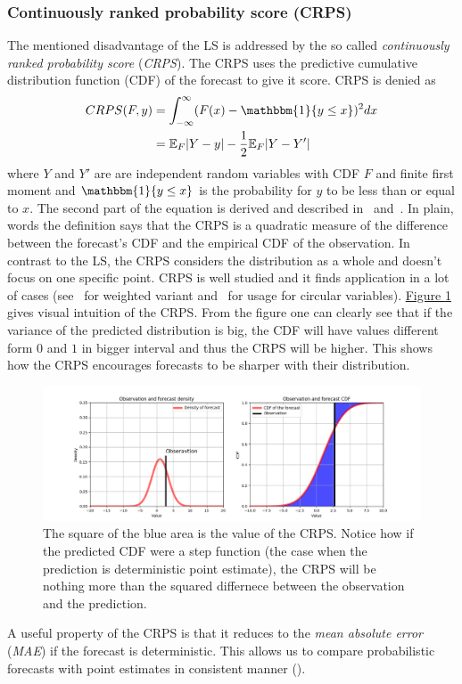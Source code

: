 \documentclass[12pt,a4paper,twoside]{scrartcl}
\numberwithin{equation}{section}
\newcommand{\reffig}[1]{\hyperref[#1]{Figure \ref*{#1}}}
\begin{document}
\subsubsection{Continuously ranked probability score (CRPS)}\label{sec:crps}
The mentioned disadvantage of the LS is addressed by the so called \emph{continuously ranked probability score} (\emph{CRPS}). The CRPS uses the predictive cumulative distribution function (CDF) of the forecast to give it score. CRPS is denied as
\begin{align}
  \label{eq:crps}
  CRPS(F,y)  &= \int_{-\infty}^{\infty}(F(x) - \mathbbm{1}\{y \leq x \})^2dx \\
             &= \mathbb{E}_F|Y - y| - \frac{1}{2}\mathbb{E}_F|Y - Y'|
\end{align}
where \(Y\) and \(Y'\) are are independent random variables with CDF \(F\) and finite first moment and \(\mathbbm{1}\{y \leq x \}\) is the probability for \(y\) to be less than or equal to \(x \). The second part of the equation is derived and described in~\cite{rafteryg2007} and~\cite{matheson1976}. In plain, words the definition says that the CRPS is a quadratic measure of the difference between the forecast's CDF and the empirical CDF of the observation. In contrast to the LS, the CRPS considers the distribution as a whole and doesn't focus on one specific point. CRPS is well studied and it finds application in a lot of cases (see~\cite{ranjan2011} for weighted variant and~\cite{grimit2007} for usage for circular variables). \reffig{fig:crps} gives visual intuition of the CRPS. From the figure one can clearly see that if the variance of the predicted distribution is big, the CDF will have values different form \(0\) and \(1\) in bigger interval and thus the CRPS will be higher. This shows how the CRPS encourages forecasts to be sharper with their distribution.
\vfill
\begin{center}
  \begin{figure}[H]
    \centering
    \includegraphics[height=0.41\textwidth, width=1\textwidth]{figures/crps.png}
    \caption[Continuous Rank Probability Score Intuition]{The square of the blue area is the value of the CRPS. Notice how if the predicted CDF were a step function (the case when the prediction is deterministic point estimate), the CRPS will be nothing more than the squared differnece between the observation and the prediction.}\label{fig:crps}
  \end{figure}
\end{center}
A useful property of the CRPS is that it reduces to the \emph{mean absolute error} (\emph{MAE}) if the forecast is deterministic. This allows us to compare probabilistic forecasts with point estimates in consistent manner (\cite{gneiting2014}).
\end{document}
